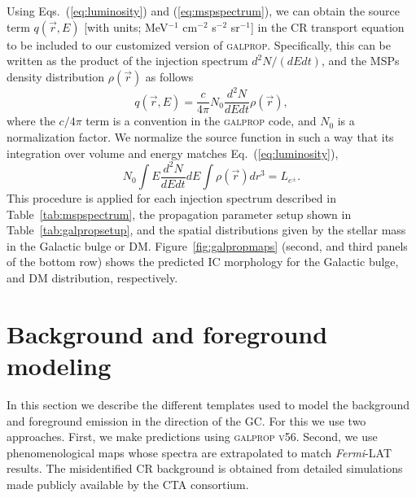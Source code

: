 \documentclass[doublespace,nopageskip]{VTthesis} %
\begin{document}
Using Eqs.~(\ref{eq:luminosity}) and (\ref{eq:mspspectrum}), we can obtain the source term $q(\vec{r},E)$ [with units; MeV$^{-1}$ cm$^{-2}$ s$^{-2}$ sr$^{-1}$] in the CR transport equation to be included to our customized version of \textsc{galprop}. Specifically, this can be written as the product of the injection spectrum $d^2N/(dEdt)$, and the MSPs density distribution $\rho(\vec{r})$ as follows 
\begin{equation}\label{eq:sourcefunction}
  q(\vec{r},E) = \frac{c}{4\pi} N_0 \dfrac{d^2N}{dEdt}\rho(\vec{r}),
\end{equation}
where the $c/4\pi$ term is a convention in the \textsc{galprop} code, and $N_0$ is a normalization factor. We normalize the source function in such a way that its integration over volume and energy matches Eq.~(\ref{eq:luminosity}),
\begin{equation}
  \label{eq:norm}
  N_0 \int E\dfrac{d^2N}{dEdt}dE \int\rho(\vec{r})dr^3 = L_{e^\pm}. 
\end{equation}
This procedure is applied for each injection spectrum described in Table~\ref{tab:mspspectrum}, the propagation parameter setup shown in Table~\ref{tab:galpropsetup}, and the spatial distributions given by the stellar mass in the Galactic bulge or DM. Figure~\ref{fig:galpropmaps} (second, and third panels of the bottom row) shows  the predicted IC morphology for the Galactic bulge, and DM distribution, respectively.   


\section{Background and foreground modeling}
\label{sec:backgroundtemplates}
In this section we describe the different templates used to model the background and foreground emission in the direction of the GC. For this we use two approaches. First, we make predictions using \textsc{galprop v56}. Second, we use phenomenological maps whose spectra are extrapolated to match \textit{Fermi}-LAT results. The misidentified CR background is obtained from detailed simulations made publicly available by the CTA consortium.
\end{document}

